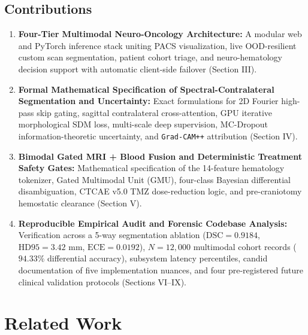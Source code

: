 \documentclass[conference]{IEEEtran}
\begin{document}
\subsection{Contributions}
\begin{enumerate}
    \item \textbf{Four-Tier Multimodal Neuro-Oncology Architecture:} A modular web and PyTorch inference stack uniting PACS visualization, live OOD-resilient custom scan segmentation, patient cohort triage, and neuro-hematology decision support with automatic client-side failover (Section III).
    \item \textbf{Formal Mathematical Specification of Spectral-Contralateral Segmentation and Uncertainty:} Exact formulations for 2D Fourier high-pass skip gating, sagittal contralateral cross-attention, GPU iterative morphological SDM loss, multi-scale deep supervision, MC-Dropout information-theoretic uncertainty, and \texttt{Grad-CAM++} attribution (Section IV).
    \item \textbf{Bimodal Gated MRI + Blood Fusion and Deterministic Treatment Safety Gates:} Mathematical specification of the 14-feature hematology tokenizer, Gated Multimodal Unit (GMU), four-class Bayesian differential disambiguation, CTCAE v5.0 TMZ dose-reduction logic, and pre-craniotomy hemostatic clearance (Section V).
    \item \textbf{Reproducible Empirical Audit and Forensic Codebase Analysis:} Verification across a 5-way segmentation ablation ($\text{DSC} = 0.9184$, $\text{HD95} = 3.42\text{ mm}$, $\text{ECE} = 0.0192$), $N = 12,000$ multimodal cohort records ($94.33\%$ differential accuracy), subsystem latency percentiles, candid documentation of five implementation nuances, and four pre-registered future clinical validation protocols (Sections VI--IX).
\end{enumerate}

\section{Related Work}
\end{document}
